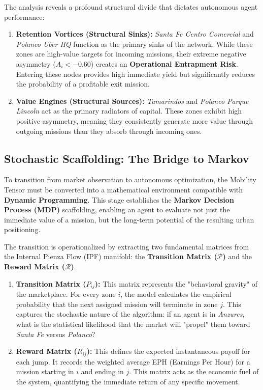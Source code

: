 The analysis reveals a profound structural divide that dictates autonomous agent performance:

\begin{enumerate}[noitemsep, topsep=3pt]
    \item \textbf{Retention Vortices (Structural Sinks):} \textit{Santa Fe Centro Comercial} and \textit{Polanco Uber HQ} function as the primary sinks of the network. While these zones are high-value targets for incoming missions, their extreme negative asymmetry ($A_i < -0.60$) creates an \textbf{Operational Entrapment Risk}. Entering these nodes provides high immediate yield but significantly reduces the probability of a profitable exit mission.
    
    \item \textbf{Value Engines (Structural Sources):} \textit{Tamarindos} and \textit{Polanco Parque Lincoln} act as the primary radiators of capital. These zones exhibit high positive asymmetry, meaning they consistently generate more value through outgoing missions than they absorb through incoming ones. 
\end{enumerate}


\subsection{Stochastic Scaffolding: The Bridge to Markov}

To transition from market observation to autonomous optimization, the Mobility Tensor must be converted into a mathematical environment compatible with \textbf{Dynamic Programming}. This stage establishes the \textbf{Markov Decision Process (MDP)} scaffolding, enabling an agent to evaluate not just the immediate value of a mission, but the long-term potential of the resulting urban positioning.

The transition is operationalized by extracting two fundamental matrices from the Internal Pienza Flow (IPF) manifold: the \textbf{Transition Matrix ($\mathcal{P}$)} and the \textbf{Reward Matrix ($\mathcal{R}$)}.

\begin{enumerate}[noitemsep, topsep=3pt]
    \item \textbf{Transition Matrix ($P_{ij}$):} This matrix represents the "behavioral gravity" of the marketplace. For every zone $i$, the model calculates the empirical probability that the next assigned mission will terminate in zone $j$. This captures the stochastic nature of the algorithm: if an agent is in \textit{Anzures}, what is the statistical likelihood that the market will "propel" them toward \textit{Santa Fe} versus \textit{Polanco}?
    
    \item \textbf{Reward Matrix ($R_{ij}$):} This defines the expected instantaneous payoff for each jump. It records the weighted average EPH (Earnings Per Hour) for a mission starting in $i$ and ending in $j$. This matrix acts as the economic fuel of the system, quantifying the immediate return of any specific movement.
\end{enumerate}

